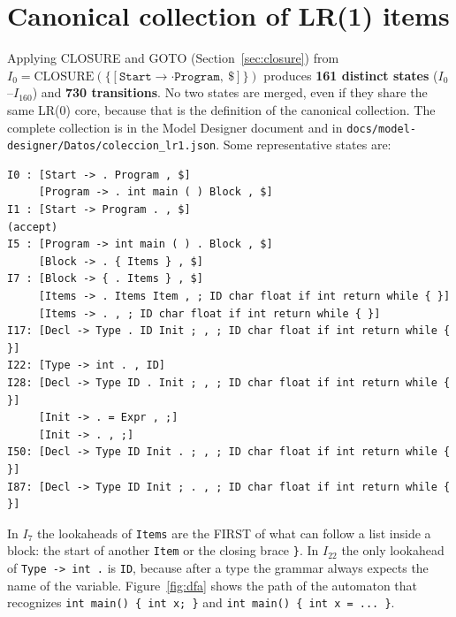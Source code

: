 \documentclass[11pt,letterpaper]{article}
\let\oldsection\section
\renewcommand{\section}{\needspace{8\baselineskip}\oldsection}
\newcommand{\tok}[1]{\texttt{#1}}
\begin{document}
\section{Canonical collection of LR(1) items}

Applying CLOSURE and GOTO (Section~\ref{sec:closure}) from
$I_0=\text{CLOSURE}(\{[\texttt{Start}\to\cdot\texttt{Program},\ \$]\})$
produces \textbf{161 distinct states} ($I_0$--$I_{160}$) and \textbf{730
transitions}. No two states are merged, even if they share the same LR(0)
core, because that is the definition of the canonical collection. The
complete collection is in the Model Designer document \cite{md} and in
\texttt{docs/model-designer/Datos/coleccion\_lr1.json}. Some representative
states are:

\par\noindent\begin{minipage}{\linewidth}
\begin{lstlisting}
I0 : [Start -> . Program , $]
     [Program -> . int main ( ) Block , $]
I1 : [Start -> Program . , $]                                   (accept)
I5 : [Program -> int main ( ) . Block , $]
     [Block -> . { Items } , $]
I7 : [Block -> { . Items } , $]
     [Items -> . Items Item , ; ID char float if int return while { }]
     [Items -> . , ; ID char float if int return while { }]
I17: [Decl -> Type . ID Init ; , ; ID char float if int return while { }]
I22: [Type -> int . , ID]
I28: [Decl -> Type ID . Init ; , ; ID char float if int return while { }]
     [Init -> . = Expr , ;]
     [Init -> . , ;]
I50: [Decl -> Type ID Init . ; , ; ID char float if int return while { }]
I87: [Decl -> Type ID Init ; . , ; ID char float if int return while { }]
\end{lstlisting}
\end{minipage}\par


In $I_7$ the lookaheads of \texttt{Items} are the FIRST of what can follow a
list inside a block: the start of another \texttt{Item} or the closing brace
\tok{\}}. In $I_{22}$ the only lookahead of \texttt{Type -> int .} is \tok{ID},
because after a type the grammar always expects the name of the variable.
Figure~\ref{fig:dfa} shows the path of the automaton that recognizes
\texttt{int main() \{ int x; \}} and \texttt{int main() \{ int x = ... \}}.
\end{document}
